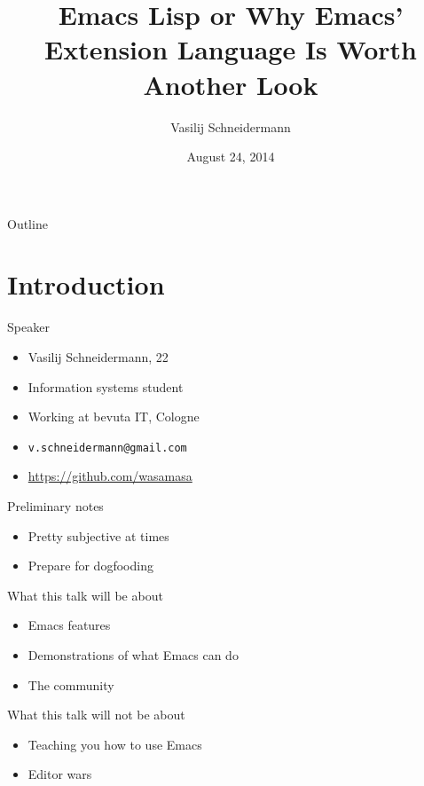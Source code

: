 \documentclass[presentation]{beamer}
\author{Vasilij Schneidermann}
\date{August 24, 2014}
\title{Emacs Lisp or Why Emacs' Extension Language Is Worth Another Look}
\begin{document}
\maketitle
\begin{frame}{Outline}
\tableofcontents
\end{frame}

\AtBeginSection{\frame{\sectionpage}}

\section{Introduction}
\label{sec-1}

\begin{frame}[label=sec-1-1]{Speaker}
\begin{itemize}
\item Vasilij Schneidermann, 22
\item Information systems student
\item Working at bevuta IT, Cologne
\item \texttt{v.schneidermann@gmail.com}
\item \url{https://github.com/wasamasa}
\end{itemize}
\end{frame}

\begin{frame}[label=sec-1-2]{Preliminary notes}
\begin{itemize}
\item Pretty subjective at times
\item Prepare for dogfooding
\end{itemize}
\end{frame}

\begin{frame}[label=sec-1-3]{What this talk will be about}
\begin{itemize}
\item Emacs features
\item Demonstrations of what Emacs can do
\item The community
\end{itemize}
\end{frame}

\begin{frame}[label=sec-1-4]{What this talk will not be about}
\begin{itemize}
\item Teaching you how to use Emacs
\item Editor wars
\end{itemize}
\end{frame}
\end{document}
